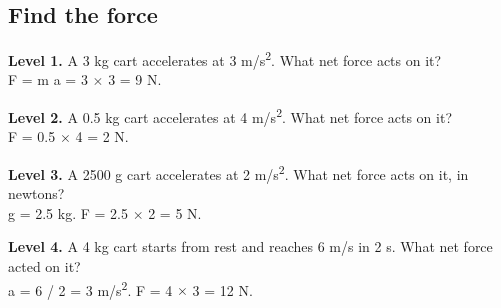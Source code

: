 \documentclass[11pt]{article}
\begin{document}
\subsection*{Find the force}
\noindent\textbf{Level 1.} A 3 kg cart accelerates at 3 m/s\textsuperscript{2}. What net force acts on it?\\  \quad F = m a = 3 $\times$ 3 = 9 N.\par\medskip
\noindent\textbf{Level 2.} A 0.5 kg cart accelerates at 4 m/s\textsuperscript{2}. What net force acts on it?\\  \quad F = 0.5 $\times$ 4 = 2 N.\par\medskip
\noindent\textbf{Level 3.} A 2500 g cart accelerates at 2 m/s\textsuperscript{2}. What net force acts on it, in newtons?\\   g = 2.5 kg. F = 2.5 $\times$ 2 = 5 N.\par\medskip
\noindent\textbf{Level 4.} A 4 kg cart starts from rest and reaches 6 m/s in 2 s. What net force acted on it?\\  \quad a = 6 / 2 = 3 m/s\textsuperscript{2}. F = 4 $\times$ 3 = 12 N.\par\medskip
\end{document}
